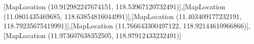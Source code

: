 [MapLocation (10.912982247674151, 118.53967120732491)],[MapLocation (11.0801435469685, 118.63854816044991)],[MapLocation (11.403409177232191, 118.79235675419991)],[MapLocation (11.766643300497122, 118.92144610966866)],[MapLocation (11.973607638352505, 118.97912433232491)]